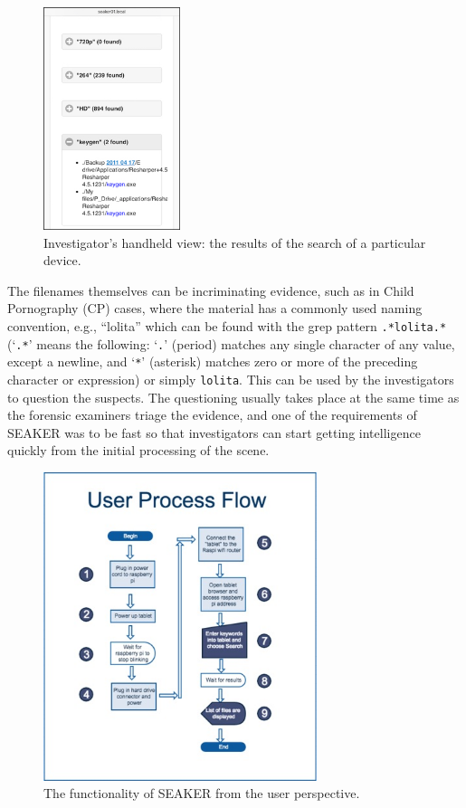 \documentclass[12pt]{article}
\begin{document}
\begin{figure}[ht]
\begin{center}
\includegraphics[width=4cm]{images/seaker-hh-screen-3.jpg}
\caption{Investigator's handheld view: the results of the search of a
particular device.}\label{fig:screen-3}
\end{center}
\end{figure}

The filenames themselves can be incriminating evidence, such as in
Child Pornography (CP) cases, where the material has a commonly used
naming convention, e.g., ``lolita'' which can be found with the grep
pattern \verb|.*lolita.*| (`\verb|.*|' means the
following: `\verb|.|' (period)  matches any single character of any
value, except
a newline, and `\verb|*|' (asterisk) matches zero or more of the
preceding character or expression) or simply \verb|lolita|.
This can be used by the
investigators to question the suspects.  The questioning usually
takes place at the same time as the forensic examiners triage the
evidence, and one of the requirements of SEAKER was to be fast so that
investigators can start getting intelligence quickly from the initial
processing of the scene.

\begin{figure}[ht]
\begin{center}
\includegraphics[width=8cm]{images/user_process_flow.jpg}
\caption{The functionality of SEAKER from the user perspective.}
\end{center}
\end{figure}
\end{document}
